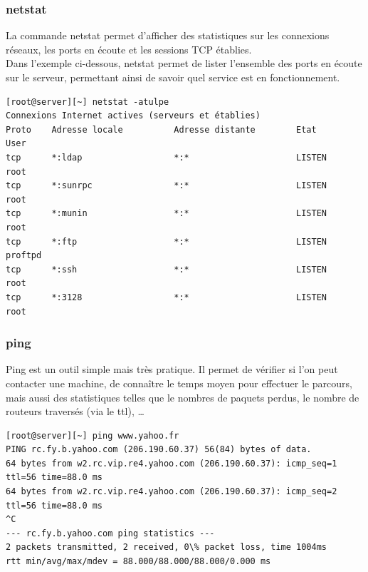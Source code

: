 \documentclass[12pt,a4paper,notitlepage]{article}
\begin{document}
\subsubsection{netstat}

La commande netstat permet d'afficher des statistiques sur les connexions réseaux, les ports en écoute et les sessions TCP établies.\\

Dans l'exemple ci-dessous, netstat permet de lister l'ensemble des ports en écoute sur le serveur, permettant ainsi de savoir quel service est en fonctionnement.
{\footnotesize \begin{verbatim}
[root@server][~] netstat -atulpe
Connexions Internet actives (serveurs et établies)
Proto    Adresse locale          Adresse distante        Etat        User    
tcp      *:ldap                  *:*                     LISTEN      root                
tcp      *:sunrpc                *:*                     LISTEN      root       
tcp      *:munin                 *:*                     LISTEN      root     
tcp      *:ftp                   *:*                     LISTEN      proftpd   
tcp      *:ssh                   *:*                     LISTEN      root        
tcp      *:3128                  *:*                     LISTEN      root         
\end{verbatim}}

\subsubsection{ping}
Ping est un outil simple mais très pratique. Il permet de vérifier si l'on peut contacter une machine, de connaître le temps moyen pour effectuer le parcours, mais aussi des statistiques telles que le nombres de paquets perdus, le nombre de routeurs traversés (via le ttl), \ldots

{\footnotesize \begin{verbatim}
[root@server][~] ping www.yahoo.fr                                                     
PING rc.fy.b.yahoo.com (206.190.60.37) 56(84) bytes of data.
64 bytes from w2.rc.vip.re4.yahoo.com (206.190.60.37): icmp_seq=1 ttl=56 time=88.0 ms
64 bytes from w2.rc.vip.re4.yahoo.com (206.190.60.37): icmp_seq=2 ttl=56 time=88.0 ms
^C
--- rc.fy.b.yahoo.com ping statistics ---
2 packets transmitted, 2 received, 0\% packet loss, time 1004ms
rtt min/avg/max/mdev = 88.000/88.000/88.000/0.000 ms      
\end{verbatim}}
\end{document}
